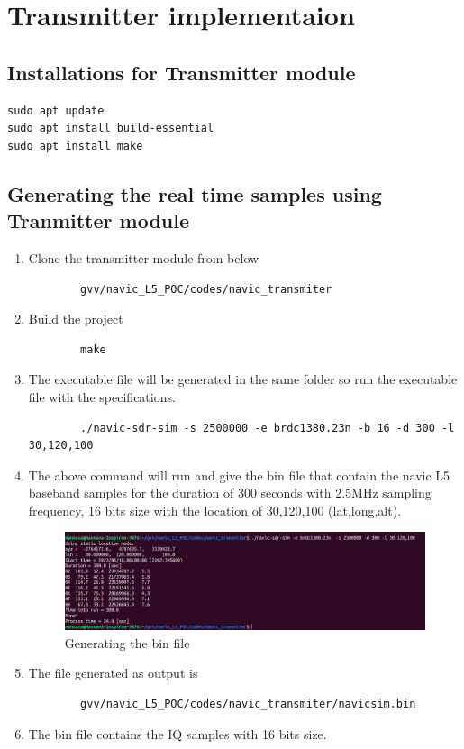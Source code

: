 \section{Transmitter implementaion}

\subsection{Installations for Transmitter module}
\begin{lstlisting}
sudo apt update
sudo apt install build-essential
sudo apt install make
\end{lstlisting}

\subsection{Generating the real time samples using Tranmitter module}
\begin{enumerate}
    \item Clone the transmitter module from below
    \begin{lstlisting}
        gvv/navic_L5_POC/codes/navic_transmiter
    \end{lstlisting}
    \item Build the project 
    \begin{lstlisting}
        make
    \end{lstlisting}
    \item The executable file will be generated in the same folder so run the executable file with the specifications.
    \begin{lstlisting}
        ./navic-sdr-sim -s 2500000 -e brdc1380.23n -b 16 -d 300 -l 30,120,100
    \end{lstlisting}
    \item The above command will run and give the bin file that contain the navic L5 baseband samples for the duration of 300 seconds  with 2.5MHz sampling frequency, 16 bits size with the location of 30,120,100 (lat,long,alt). 
    \begin{normalsize}
        \begin{figure}[ht]
            \centering
            \includegraphics[width=1.25\textwidth]{figs/bin_file_gen.png}
            \centering
            \captionsetup{justification=centering}
            \caption{Generating the bin file}
            \end{figure}
        \end{normalsize}
    \item The file generated as output is 
    \begin{lstlisting}
        gvv/navic_L5_POC/codes/navic_transmiter/navicsim.bin
    \end{lstlisting}
    \item The bin file contains the IQ samples with 16 bits size. 
\end{enumerate}

